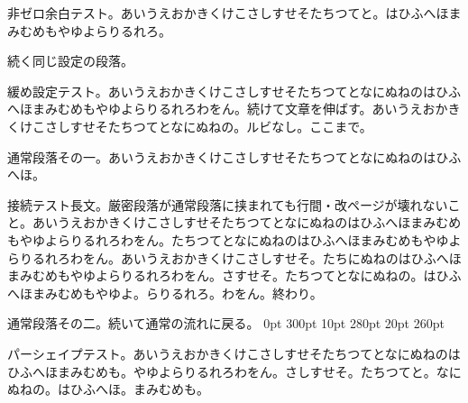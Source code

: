 \documentclass[pdflatex]{jlreq}
\begin{document}
\begingroup
\parskip=5pt
\rightskip=10pt
\begin{ptjparagraph}
非ゼロ余白テスト。あいうえおかきくけこさしすせそたちつてと。はひふへほまみむめもやゆよらりるれろ。
\end{ptjparagraph}
続く同じ設定の段落。
\endgroup
\begingroup
\begin{ptjparagraph}
緩め設定テスト。あいうえおかきくけこさしすせそたちつてとなにぬねのはひふへほまみむめもやゆよらりるれろわをん。続けて文章を伸ばす。あいうえおかきくけこさしすせそたちつてとなにぬねの。ルビなし。ここまで。
\end{ptjparagraph}
\endgroup
通常段落その一。あいうえおかきくけこさしすせそたちつてとなにぬねのはひふへほ。
\begin{ptjparagraph}
接続テスト長文。厳密段落が通常段落に挟まれても行間・改ページが壊れないこと。あいうえおかきくけこさしすせそたちつてとなにぬねのはひふへほまみむめもやゆよらりるれろわをん。たちつてとなにぬねのはひふへほまみむめもやゆよらりるれろわをん。あいうえおかきくけこさしすせそ。たちにぬねのはひふへほまみむめもやゆよらりるれろわをん。さすせそ。たちつてとなにぬねの。はひふへほまみむめもやゆよ。らりるれろ。わをん。終わり。
\end{ptjparagraph}
通常段落その二。続いて通常の流れに戻る。
\begingroup
{} 0pt 300pt 10pt 280pt 20pt 260pt
\begin{ptjparagraph}
パーシェイプテスト。あいうえおかきくけこさしすせそたちつてとなにぬねのはひふへほまみむめも。やゆよらりるれろわをん。さしすせそ。たちつてと。なにぬねの。はひふへほ。まみむめも。
\end{ptjparagraph}
\endgroup
\makeatletter
{}
\makeatother
\end{document}
